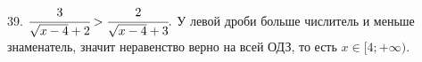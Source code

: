 39. $\cfrac{3}{\sqrt{x-4}+2}>\cfrac{2}{\sqrt{x-4}+3}.$ У левой дроби больше числитель и меньше знаменатель, значит неравенство верно на всей ОДЗ, то есть $x\in[4;+\infty).$\\
